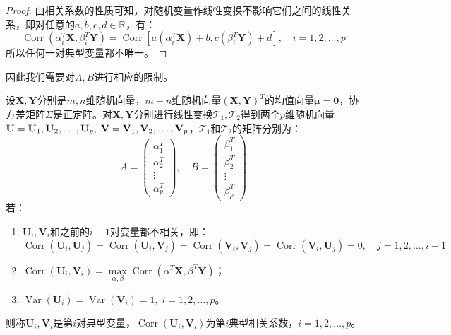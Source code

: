 \begin{proof}
	由相关系数的性质可知，对随机变量作线性变换不影响它们之间的线性关系，即对任意的$a,b,c,d\in\mathbb{R}^{}$，有：
	\begin{equation*}
		\operatorname{Corr}(\alpha_i^T\mathbf{X},\beta_i^T\mathbf{Y})=\operatorname{Corr}[a(\alpha_i^T\mathbf{X})+b,c(\beta_i^T\mathbf{Y})+d],\quad i=1,2,\dots,p
	\end{equation*}
	所以任何一对典型变量都不唯一。
\end{proof}
因此我们需要对$A,B$进行相应的限制。
\begin{definition}
	设$\mathbf{X},\mathbf{Y}$分别是$m,n$维随机向量，$m+n$维随机向量$(\mathbf{X},\mathbf{Y})^T$的均值向量$\boldsymbol{\mu}=\mathbf{0}$，协方差矩阵$\Sigma$是正定阵。对$\mathbf{X},\mathbf{Y}$分别进行线性变换$\mathcal{T}_1,\mathcal{T}_2$得到两个$p$维随机向量$\mathbf{U}=\mathbf{U}_1, \mathbf{U}_2, \dots, \mathbf{U}_{p},\;\mathbf{V}=\mathbf{V}_1, \mathbf{V}_2, \dots, \mathbf{V}_{p}$，$\mathcal{T}_1$和$\mathcal{T}_2$的矩阵分别为：
	\begin{equation*}
		A=
		\begin{pmatrix}
			\alpha_1^T \\
			\alpha_2^T \\
			\vdots \\
			\alpha_p^T
		\end{pmatrix},\quad
		B=
		\begin{pmatrix}
			\beta_1^T \\
			\beta_2^T \\
			\vdots \\
			\beta_p^T
		\end{pmatrix}
	\end{equation*}
	若：
	\begin{enumerate}
		\item $\mathbf{U}_i,\mathbf{V}_i$和之前的$i-1$对变量都不相关，即：
		\begin{equation*}
			\operatorname{Corr}(\mathbf{U}_i,\mathbf{U}_j)=\operatorname{Corr}(\mathbf{U}_i,\mathbf{V}_j)=\operatorname{Corr}(\mathbf{V}_i,\mathbf{V}_j)=\operatorname{Corr}(\mathbf{V}_i,\mathbf{U}_j)=0,\quad j=1,2,\dots,i-1
		\end{equation*}
		\item $\operatorname{Corr}(\mathbf{U}_i,\mathbf{V}_i)=\max\limits_{\alpha,\beta}\operatorname{Corr}(\alpha^T\mathbf{X},\beta^T\mathbf{Y})$；
		\item $\operatorname{Var}(\mathbf{U}_i)=\operatorname{Var}(\mathbf{V}_i)=1,\;i=1,2,\dots,p$。
	\end{enumerate}
	则称$\mathbf{U}_i,\mathbf{V}_i$是第$i$对典型变量，$\operatorname{Corr}(\mathbf{U}_i,\mathbf{V}_i)$为第$i$典型相关系数，$i=1,2,\dots,p$。
\end{definition}
